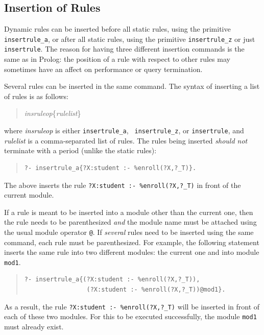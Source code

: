 \documentclass[11pt]{article}
\begin{document}
\subsection{Insertion of Rules}
\label{sec-insertingrule}

Dynamic rules can be inserted before all static rules, using the
primitive {\tt insertrule\_a}, or after all static rules, using the
primitive {\tt insertrule\_z} or just {\tt insertrule}.
The reason for having three different insertion commands is the same as in
Prolog: the position of a rule with respect to other rules
may sometimes have an affect on
performance or query termination.

Several rules
can be inserted in the same command. The syntax of inserting a list of
rules is as follows:
\begin{quote}
\emph{insruleop}\{\emph{rulelist}\}
\end{quote}
\noindent
where \emph{insruleop} is either {\tt insertrule\_a}, {\tt
  insertrule\_z}, or {\tt insertrule},  and \emph{rulelist}  is a comma-separated
  list of rules.  The rules being inserted \emph{should not} terminate
  with a period (unlike the static rules):
\begin{quote}
\begin{verbatim}
?- insertrule_a{?X:student :- %enroll(?X,?_T)}.
\end{verbatim}
\end{quote}
The above inserts the rule {\tt ?X:student :- \verb|%|enroll(?X,?\_T)} in
front of the current module.

If a rule is meant to be inserted into a module other than the current one,
then the rule needs to be parenthesized \emph{and} the module name must be
attached using the usual module operator {\tt @}. If \emph{several} rules
need to be inserted using the same command, each rule must be
parenthesized.  For example, the following statement inserts the same rule
into two different modules: the current one and into module {\tt mod1}.
\begin{quote}
\begin{verbatim}
?- insertrule_a{(?X:student :- %enroll(?X,?_T)),
                 (?X:student :- %enroll(?X,?_T))@mod1}.
\end{verbatim}
\end{quote}
As a result, the rule {\tt ?X:student :- \verb|%|enroll(?X,?\_T)} will be
inserted in front of each of these two modules.  For this to be executed
successfully, the module {\tt mod1} must already exist.
\end{document}
